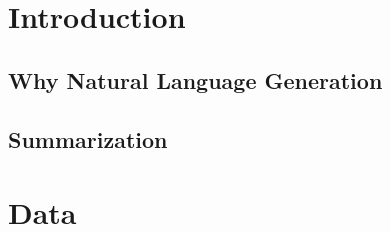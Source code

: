 \documentclass[11pt,a4paper]{report}
\begin{document}
\section{Introduction}
\subsection{Why Natural Language Generation}
\subsection{Summarization}
\section{Data}
\end{document}
